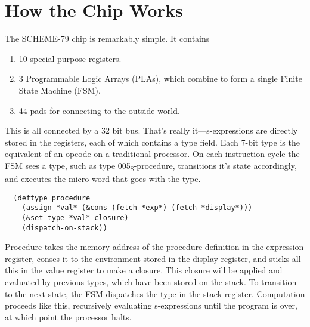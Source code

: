 \documentclass[12pt]{article}
\begin{document}
\section{How the Chip Works}
The SCHEME-79 chip is remarkably simple.  It contains
\begin{enumerate}
  \item 10 special-purpose registers.
  \item 3 Programmable Logic Arrays (PLAs), which combine to form a single Finite
    State Machine (FSM).
  \item 44 pads for connecting to the outside world.
\end{enumerate}
This is all connected by a 32 bit bus.  That's really
it---s-expressions are directly stored in the registers, each of which
contains a type field.  Each 7-bit type is the equivalent of an opcode
on a traditional processor.  On each instruction cycle the FSM sees a
type, such as type 005\textsubscript{8}-procedure, transitions it's state
accordingly, and executes the micro-word that goes with the type.
\begin{lstlisting}
  (deftype procedure
    (assign *val* (&cons (fetch *exp*) (fetch *display*)))
    (&set-type *val* closure)
    (dispatch-on-stack))
\end{lstlisting}
Procedure takes the memory address of the procedure definition in the
expression register, conses it to the environment stored in the
display register, and sticks all this in the value register to make a
closure.  This closure will be applied and evaluated by previous
types, which have been stored on the stack.  To transition to the next
state, the FSM dispatches the type in the stack register.  Computation
proceeds like this, recursively evaluating s-expressions until the
program is over, at which point the processor halts.
\end{document}
